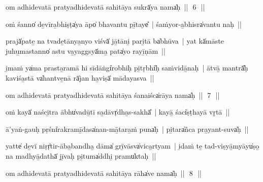 \documentclass[parskip, DIV=14]{scrartcl}
\begin{document}
{om adhidevatā pratyadhidevatā sahitāya sukrā̍ya॒ nama̍ḥ~||~\,6\,~||
\vspace{0.5cm}

oṁ śanno̍ de̱vīra̱bhiṣṭa̍ya॒ āpo̍ bhavantu pī̱taye̎~| śaṁyor-a̱bhisra̍vantu naḥ~||


prajā̍pate̱ na tvade̱tānya̱nyo viśvā̍ jā̱tāni̱ pari̱tā ba̍bhūva~| yat kā̍māste juhu̱mastanno̍ astu va̱yaggsyā̍ma̱ pata̍yo rayī̱ṇām~||


i̱maṁ ya̍ma prasta̱ramā hi sīdāṅgi̍robhiḥ pi̱tṛbhi̍ḥ saṁvidā̱naḥ~| ātvā̱ mantrā̎ḥ kaviśa̱stā va̍hantve̱nā rā̍jan ha̱viṣā̍ mādayasva~||


om adhidevatā pratyadhidevatā sahitāya śanaiśca̍rāya॒ nama̍ḥ~||~\,7\,~||
\vspace{0.5cm}

oṁ kayā̍ naści̱tra ābhu̍vadū̱tī sa̱dāvṛ̍dha̱s-sakhā̎~| kayā̱ śaci̍ṣṭhayā vṛ̱tā~||


ā'yaṅ-gauḥ pṛśni̍rakramī̱dasa̍nan-mā̱tara̱ṁ puna̍ḥ~| pi̱tara̍ñca pra̱yant-suva̍ḥ~||


yatte̍ de̱vī niṛṛ̍tir-āba̱bandha̱ dāma̍ grī̱vāsva̍vica̱rtyam~| i̱daṁ te̱ tad-viṣyā̱myāyu̍ṣo̱ na madhyā̱dathā̍ jī̱vaḥ pi̱tuma̍ddhi̱ pramu̍ktaḥ~||


om adhidevatā pratyadhidevatā sahitāya rāha̍ve॒ nama̍ḥ~||~\,8\,~||
\vspace{0.5cm}

}
\end{document}

